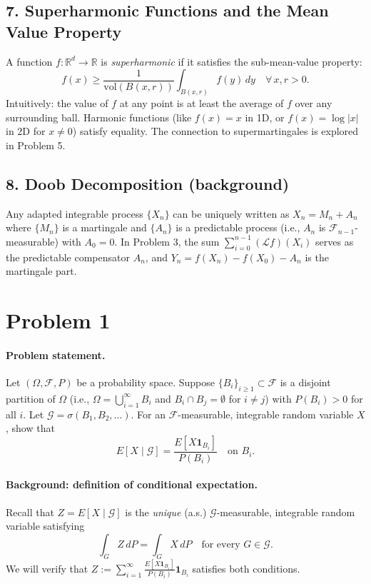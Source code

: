\documentclass[11pt]{article}
\newcommand{\R}{\mathbb{R}}
\newcommand{\F}{\mathcal{F}}
\newcommand{\G}{\mathcal{G}}
\newcommand{\1}{\mathbf{1}}
\newcommand{\vol}{\mathrm{vol}}
\theoremstyle{plain}
\begin{document}
\subsection*{7. Superharmonic Functions and the Mean Value Property}

A function $f:\R^d\to\R$ is \emph{superharmonic} if it satisfies the
sub-mean-value property:
\[
  f(x) \ge \frac{1}{\vol(B(x,r))}\int_{B(x,r)}f(y)\,dy \quad\forall\,x,r>0.
\]
Intuitively: the value of $f$ at any point is at least the average of $f$ over
any surrounding ball. Harmonic functions (like $f(x)=x$ in 1D, or $f(x)=\log|x|$
in 2D for $x\neq0$) satisfy equality. The connection to supermartingales is
explored in Problem 5.

\subsection*{8. Doob Decomposition (background)}

Any adapted integrable process $\{X_n\}$ can be uniquely written as
$X_n=M_n+A_n$ where $\{M_n\}$ is a martingale and $\{A_n\}$ is a predictable
process (i.e., $A_n$ is $\F_{n-1}$-measurable) with $A_0=0$. In Problem 3, the
sum $\sum_{i=0}^{n-1}(\mathcal{L}f)(X_i)$ serves as the predictable compensator
$A_n$, and $Y_n=f(X_n)-f(X_0)-A_n$ is the martingale part.

\section*{Problem 1}

\paragraph{Problem statement.}
Let $(\Omega,\F,P)$ be a probability space. Suppose $\{B_i\}_{i\ge1}\subset\F$ is
a disjoint partition of $\Omega$ (i.e., $\Omega=\bigcup_{i=1}^{\infty}B_i$ and
$B_i\cap B_j=\emptyset$ for $i\neq j$) with $P(B_i)>0$ for all $i$.
Let $\G=\sigma(B_1,B_2,\ldots)$. For an $\F$-measurable, integrable random
variable $X$, show that
\[
  E[X\mid\G] = \frac{E[X\mathbf{1}_{B_i}]}{P(B_i)}
  \quad\text{on }B_i.
\]

\paragraph{Background: definition of conditional expectation.}
Recall that $Z=E[X\mid\G]$ is the \emph{unique} (a.s.) $\G$-measurable,
integrable random variable satisfying
\[
  \int_G Z\,dP = \int_G X\,dP \quad\text{for every }G\in\G.
\]
We will verify that $Z:=\sum_{i=1}^{\infty}\frac{E[X\mathbf{1}_{B_i}]}{P(B_i)}\mathbf{1}_{B_i}$
satisfies both conditions.
\end{document}
